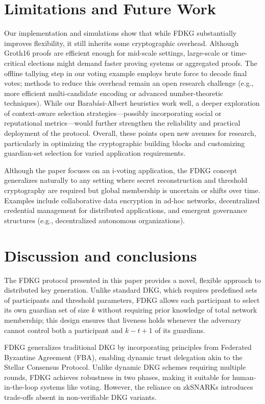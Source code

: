 \documentclass[lettersize,journal]{IEEEtran}
\theoremstyle{definition}
\begin{document}
\section{Limitations and Future Work}\label{sec:limitations-and-future}
Our implementation and simulations show that while FDKG substantially improves flexibility, it still inherits some cryptographic overhead. Although Groth16 proofs are efficient enough for mid-scale settings, large-scale or time-critical elections might demand faster proving systems or aggregated proofs. The offline tallying step in our voting example employs brute force to decode final votes; methods to reduce this overhead remain an open research challenge (e.g., more efficient multi-candidate encoding or advanced number-theoretic techniques). While our Barabási-Albert heuristics work well, a deeper exploration of context-aware selection strategies—possibly incorporating social or reputational metrics—would further strengthen the reliability and practical deployment of the protocol. Overall, these points open new avenues for research, particularly in optimizing the cryptographic building blocks and customizing guardian-set selection for varied application requirements.

Although the paper focuses on an i-voting application, the FDKG concept generalizes naturally to any setting where secret reconstruction and threshold cryptography are required but global membership is uncertain or shifts over time. Examples include collaborative data encryption in ad-hoc networks, decentralized credential management for distributed applications, and emergent governance structures (e.g., decentralized autonomous organizations).



\section{Discussion and conclusions}\label{sec:discussion-conclusion}

The FDKG protocol presented in this paper provides a novel, flexible approach to distributed key generation. Unlike standard DKG, which requires predefined sets of participants and threshold parameters, FDKG allows each participant to select its own guardian set of size $k$ without requiring prior knowledge of total network membership; this design ensures that liveness holds whenever the adversary cannot control both a participant and $k-t+1$ of its guardians.

FDKG generalizes traditional DKG by incorporating principles from Federated Byzantine Agreement (FBA), enabling dynamic trust delegation akin to the Stellar Consensus Protocol. Unlike dynamic DKG schemes requiring multiple rounds, FDKG achieves robustness in two phases, making it suitable for human-in-the-loop systems like voting. However, the reliance on zkSNARKs introduces trade-offs absent in non-verifiable DKG variants.
\end{document}
